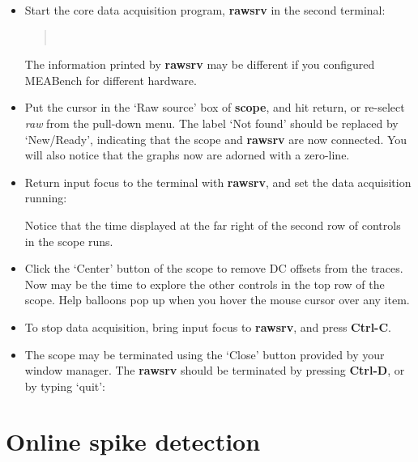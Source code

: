 \documentclass[12pt,oneside]{book}
\def\meabench{{MEABench}\xspace}
\def\prog#1{{\bf #1}}
\def\stream#1{{\it #1}\xspace}
\def\intr{{\bf Ctrl-C}\xspace}
\def\eoi{{\bf Ctrl-D}\xspace}
\begin{document}
\begin{itemize}
\item Start the core data acquisition program, \prog{rawsrv} in the
second terminal:
\begin{quotation}
\uprompt~
\compo{}
\compo{}
\end{quotation}
The information printed by \prog{rawsrv} may be different if you configured
\meabench for different hardware.
\item Put the cursor in the `Raw source' box of \prog{scope}, and hit
return, or re-select \stream{raw} from the pull-down menu. The label
`Not found' should be replaced by `New/Ready', indicating that the
scope and \prog{rawsrv} are now connected. You will also notice that
the graphs now are adorned with a zero-line.
\item Return input focus to the terminal with \prog{rawsrv}, and set
the data acquisition running: 
\begin{quotation}
\end{quotation}
Notice that the time displayed at the far right of the second row of
controls in the scope runs.
\item Click the `Center' button of the scope to remove DC offsets from
the traces. Now may be the time to explore the other controls in the top
row of the scope. Help balloons pop up when you hover the mouse cursor
over any item.
\item To stop data acquisition, bring input focus to \prog{rawsrv},
and press \intr.
\begin{quotation}
\end{quotation}
\item The scope may be terminated using the `Close' button provided by
your window manager. The \prog{rawsrv} should be terminated by
pressing \eoi, or by typing `quit':
\begin{quotation}
\uprompt
\end{quotation}
\end{itemize}

\section{Online spike detection}
\end{document}
